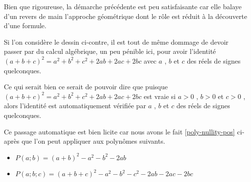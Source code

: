 \begin{figure} 
	\vspace{-.5em}
	\begin{center}
	\end{center}
	\vspace{-1.25em}
\end{figure} 

Bien que rigoureuse, la démarche précédente est peu satisfaisante car elle balaye d'un revers de main l'approche géométrique dont le rôle est réduit à la découverte d'une formule.


\medskip

Si l'on considère le dessin ci-contre, il est tout de même dommage de devoir passer par du calcul algébrique, un peu pénible ici, pour avoir l'identité $(a + b + c)^2 = a^2 + b^2 + c^2 + 2 ab + 2 ac + 2 bc$ avec $a$ , $b$ et $c$ des réels de signes quelconques.


\medskip

Ce qui serait bien ce serait de pouvoir dire que puisque $(a + b + c)^2 = a^2 + b^2 + c^2 + 2 ab + 2 ac + 2 bc$ est vraie si $a > 0$ , $b > 0$ et $c > 0$ , alors l'identité est automatiquement vérifiée par $a$ , $b$ et $c$ des réels de signes quelconques.




\medskip

Ce passage automatique est bien licite car nous avons le fait \ref{poly-nullity-pos} ci-après que l'on peut appliquer aux polynômes suivants.
\begin{itemize}[label=\small\textbullet]
	\item $P(a ; b) = (a + b)^2 - a^2 - b^2 - 2 ab$

	\item $P(a ; b ; c) = (a + b + c)^2 - a^2 - b^2 - c^2 - 2 ab - 2 ac - 2 bc$
\end{itemize}


